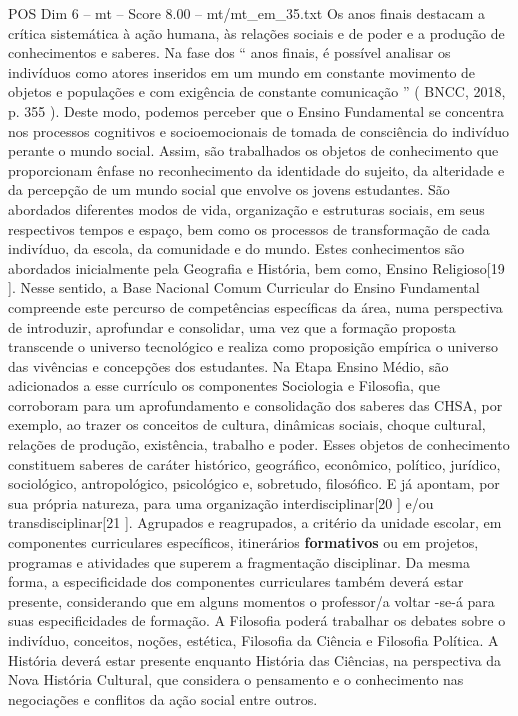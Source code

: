 \begin{textsample}{POS Dim 6 – mt – Score 8.00 – mt/mt\_em\_35.txt}
Os anos finais destacam a crítica sistemática à ação humana, às relações sociais e de poder e a produção de conhecimentos e saberes.
Na fase dos “ anos finais, é possível analisar os indivíduos como atores inseridos em um mundo em constante movimento de objetos e populações e com exigência de constante comunicação ” ( BNCC, 2018, p. 355 ).
Deste modo, podemos perceber que o Ensino Fundamental se concentra nos processos cognitivos e socioemocionais de tomada de consciência do indivíduo perante o mundo social.
Assim, são trabalhados os objetos de conhecimento que proporcionam ênfase no reconhecimento da identidade do sujeito, da alteridade e da percepção de um mundo social que envolve os jovens estudantes.
São abordados diferentes modos de vida, organização e estruturas sociais, em seus respectivos tempos e espaço, bem como os processos de transformação de cada indivíduo, da escola, da comunidade e do mundo.
Estes conhecimentos são abordados inicialmente pela Geografia e História, bem como, Ensino Religioso[19 ].
Nesse sentido, a Base Nacional Comum Curricular do Ensino Fundamental compreende este percurso de competências específicas da área, numa perspectiva de introduzir, aprofundar e consolidar, uma vez que a formação proposta transcende o universo tecnológico e realiza como proposição empírica o universo das vivências e concepções dos estudantes.
Na Etapa Ensino Médio, são adicionados a esse currículo os componentes Sociologia e Filosofia, que corroboram para um aprofundamento e consolidação dos saberes das CHSA, por exemplo, ao trazer os conceitos de cultura, dinâmicas sociais, choque cultural, relações de produção, existência, trabalho e poder.
Esses objetos de conhecimento constituem saberes de caráter histórico, geográfico, econômico, político, jurídico, sociológico, antropológico, psicológico e, sobretudo, filosófico.
E já apontam, por sua própria natureza, para uma organização interdisciplinar[20 ] e/ou transdisciplinar[21 ].
Agrupados e reagrupados, a critério da unidade escolar, em componentes curriculares específicos, itinerários \textbf{formativos} ou em projetos, programas e atividades que superem a fragmentação disciplinar.
Da mesma forma, a especificidade dos componentes curriculares também deverá estar presente, considerando que em alguns momentos o professor/a voltar -se-á para suas especificidades de formação.
A Filosofia poderá trabalhar os debates sobre o indivíduo, conceitos, noções, estética, Filosofia da Ciência e Filosofia Política.
A História deverá estar presente enquanto História das Ciências, na perspectiva da Nova História Cultural, que considera o pensamento e o conhecimento nas negociações e conflitos da ação social entre outros.

\end{textsample}
